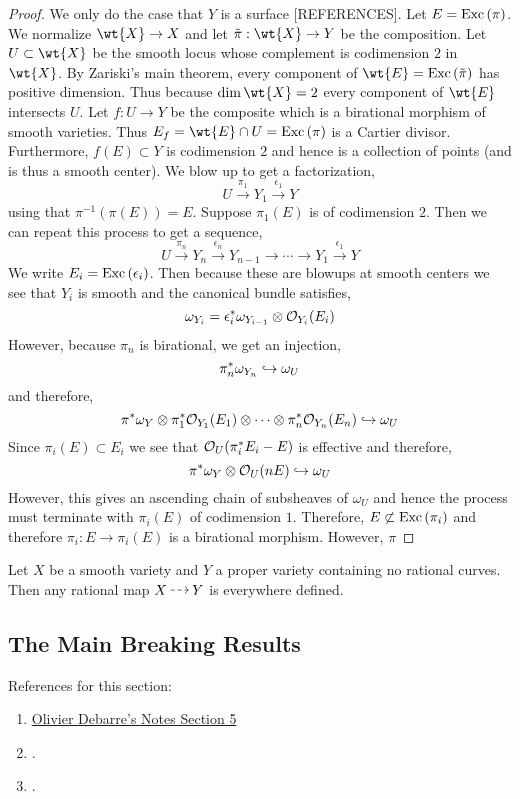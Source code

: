 \documentclass[12pt]{article}
\begin{document}
\begin{proof}
We only do the case that $Y$ is a surface [REFERENCES]. Let $E = \mathrm{Exc}\left(\pi\right)$. We normalize $\wt{X} \to X$ and let $\tilde{\pi} : \wt{X} \to Y$ be the composition. Let $U \subset \wt{X}$ be the smooth locus whose complement is codimension $2$ in $\wt{X}$. By Zariski's main theorem, every component of $\wt{E} = \Exc{\tilde{\pi}}$ has positive dimension. Thus because $\dim{\wt{X}} = 2$ every component of $\wt{E}$ intersects $U$. Let $f : U \to Y$ be the composite which is a birational morphism of smooth varieties. Thus $E_f = \wt{E} \cap U = \Exc{\pi}$ is a Cartier divisor. Furthermore, $f(E) \subset Y$ is codimension $2$ and hence is a collection of points (and is thus a smooth center). We blow up to get a factorization,
\[ U \xrightarrow{\pi_1} Y_1 \xrightarrow{\epsilon_1} Y \]
using that $\pi^{-1}(\pi(E)) = E$. Suppose $\pi_1(E)$ is of codimension $2$. Then we can repeat this process to get a sequence,
\[ U \xrightarrow{\pi_n} Y_n \xrightarrow{\epsilon_n} Y_{n-1} \to \cdots \to Y_1 \xrightarrow{\epsilon_1} Y \]
We write $E_i = \mathrm{Exc}\left(\epsilon_i\right)$. Then because these are blowups at smooth centers we see that $Y_{i}$ is smooth and the canonical bundle satisfies,
\[ \omega_{Y_i} = \epsilon_i^* \omega_{Y_{i-1}} \otimes \mathcal{O}_{Y_i}(E_i) \]
However, because $\pi_n$ is birational, we get an injection,
\[ \pi_n^* \omega_{Y_n} \hookrightarrow \omega_U \]
and therefore,
\[ \pi^* \omega_{Y} \otimes \pi_1^* \mathcal{O}_{Y_1}(E_1) \otimes \cdots \otimes \pi_n^* \mathcal{O}_{Y_n}(E_n)  \hookrightarrow \omega_U \] 
Since $\pi_i(E) \subset E_i$ we see that $\mathcal{O}_{U}(\pi_i^* E_i - E)$ is effective and therefore,
\[ \pi^* \omega_Y \otimes \mathcal{O}_{U}(n E) \hookrightarrow \omega_U \]
However, this gives an ascending chain of subsheaves of $\omega_U$ and hence the process must terminate with $\pi_i(E)$ of codimension $1$. Therefore, $E \not\subset \mathrm{Exc}\left(\pi_i\right)$ and therefore $\pi_i : E \to \pi_i(E)$ is a birational morphism. However, $\pi$
\end{proof}

\begin{cor}
Let $X$ be a smooth variety and $Y$ a proper variety containing no rational curves. Then any rational map $X \rat Y$ is everywhere defined.
\end{cor}


\subsection{The Main Breaking Results}

\begin{rmk}
References for this section:
\begin{enumerate}
\item \href{https://www.math.ens.psl.eu/~debarre/Grenoble.pdf}{Olivier Debarre's Notes Section 5}
\item \cite[Section 1.1, Corollary 1.7 and Lemma 1.9]{birational_geometry}.
\item \cite[Section II.5]{rational_curves}.
\end{enumerate}
\end{rmk}
\end{document}
